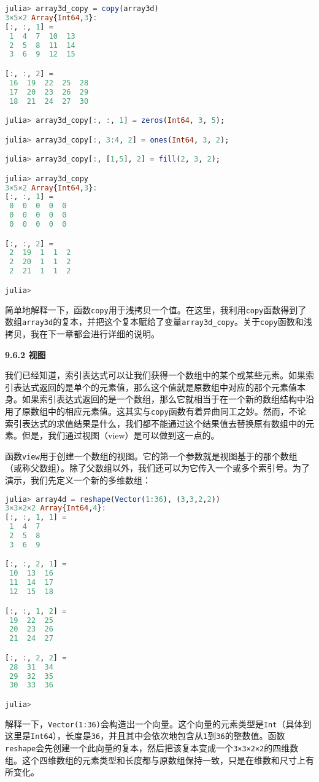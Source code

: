 \begin{lstlisting}[language=julia]
julia> array3d_copy = copy(array3d)
3×5×2 Array{Int64,3}:
[:, :, 1] =
 1  4  7  10  13
 2  5  8  11  14
 3  6  9  12  15

[:, :, 2] =
 16  19  22  25  28
 17  20  23  26  29
 18  21  24  27  30

julia> array3d_copy[:, :, 1] = zeros(Int64, 3, 5);

julia> array3d_copy[:, 3:4, 2] = ones(Int64, 3, 2);

julia> array3d_copy[:, [1,5], 2] = fill(2, 3, 2);

julia> array3d_copy
3×5×2 Array{Int64,3}:
[:, :, 1] =
 0  0  0  0  0
 0  0  0  0  0
 0  0  0  0  0

[:, :, 2] =
 2  19  1  1  2
 2  20  1  1  2
 2  21  1  1  2

julia> 
\end{lstlisting}

简单地解释一下，函数\verb|copy|用于浅拷贝一个值。在这里，我利用\verb|copy|函数得到了数组\verb|array3d|的复本，并把这个复本赋给了变量\verb|array3d_copy|。关于\verb|copy|函数和浅拷贝，我在下一章都会进行详细的说明。

\textbf{9.6.2 视图}

我们已经知道，索引表达式可以让我们获得一个数组中的某个或某些元素。如果索引表达式返回的是单个的元素值，那么这个值就是原数组中对应的那个元素值本身。如果索引表达式返回的是一个数组，那么它就相当于在一个新的数组结构中沿用了原数组中的相应元素值。这其实与\verb|copy|函数有着异曲同工之妙。然而，不论索引表达式的求值结果是什么，我们都不能通过这个结果值去替换原有数组中的元素。但是，我们通过视图（view）是可以做到这一点的。

函数\verb|view|用于创建一个数组的视图。它的第一个参数就是视图基于的那个数组（或称父数组）。除了父数组以外，我们还可以为它传入一个或多个索引号。为了演示，我们先定义一个新的多维数组：

\begin{lstlisting}[language=julia]
julia> array4d = reshape(Vector(1:36), (3,3,2,2))
3×3×2×2 Array{Int64,4}:
[:, :, 1, 1] =
 1  4  7
 2  5  8
 3  6  9

[:, :, 2, 1] =
 10  13  16
 11  14  17
 12  15  18

[:, :, 1, 2] =
 19  22  25
 20  23  26
 21  24  27

[:, :, 2, 2] =
 28  31  34
 29  32  35
 30  33  36

julia> 
\end{lstlisting}

解释一下，\verb|Vector(1:36)|会构造出一个向量。这个向量的元素类型是\verb|Int|（具体到这里是\verb|Int64|），长度是\verb|36|，并且其中会依次地包含从\verb|1|到\verb|36|的整数值。函数\verb|reshape|会先创建一个此向量的复本，然后把该复本变成一个\verb|3×3×2×2|的四维数组。这个四维数组的元素类型和长度都与原数组保持一致，只是在维数和尺寸上有所变化。

